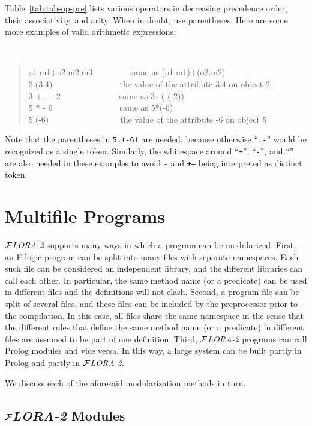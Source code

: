 \documentclass[11pt]{article}
\newcommand{\FLORA}{{\mbox{${\cal F}${\small\it LORA}\rm\emph{-2}}}\xspace}
\newcommand{\fl}{\mbox{F-logic}\xspace}
\begin{document}
Table~\ref{tab:tab-op-pre} lists various operators in decreasing precedence
order, their associativity, and arity.  When in doubt, use parentheses.
Here are some more examples of valid arithmetic expressions:
{\tt
\begin{quote}
o1.m1+o2.m2.m3~~~~~~~~~{\rm same as} (o1.m1)+(o2.m2)\\
2.(3.4)~~~~~~~~~~~~~~~~{\rm the value of the attribute} 3.4 {\rm on object} 2\\
3 + - - 2~~~~~~~~~~~~~~{\rm same as} 3+(-(-2))\\
5 * - 6~~~~~~~~~~~~~~~~{\rm same as} 5*(-6)\\
5.(-6)~~~~~~~~~~~~~~~~~{\rm the value of the attribute} -6 {\rm on object} 5
\end{quote}
}
Note that the parentheses in {\tt 5.(-6)} are needed,
because otherwise ``{\tt .-}'' would be recognized as a single token.
Similarly, the whitespace around ``{\tt +}'', ``{\tt -}'', and ``{\tt *}''
are also needed in these examples to avoid {\tt *-} and {\tt +--} being
interpreted as distinct token.


\section{Multifile Programs}

\FLORA supports many ways in which a program can be modularized.  First, an
\fl program can be split into many files with separate namespaces. Each
such file can be considered an independent library, and the different
libraries can call each other. In particular, the same method name (or a
predicate) can be used in different files and the definitions will not
clash.  Second, a program file can be split of several files, and these
files can be included by the preprocessor prior to the compilation. In this
case, all files share the same namespace in the sense that the different
rules that define the same method name (or a predicate) in different files
are assumed to be part of one definition. Third, \FLORA programs can call
Prolog modules and vice versa. In this way, a large system can be built partly
in Prolog and partly in \FLORA.

We discuss each of the aforesaid modularization methods in turn.


\subsection{\FLORA Modules} \label{sec:flora-modules}
\end{document}
